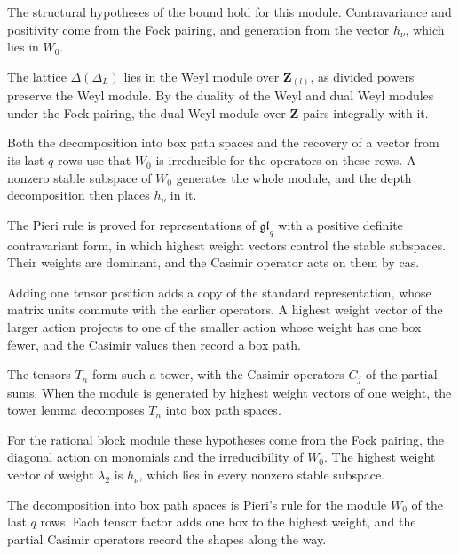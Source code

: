 The structural hypotheses of the bound hold for this module. Contravariance and positivity come from the
Fock pairing, and generation from the vector $h_\nu$, which lies in $W_0$.

The lattice $\Delta(\Delta_L)$ lies in the Weyl module over $\mathbf Z_{(l)}$, as divided powers preserve the
Weyl module. By the duality of the Weyl and dual Weyl modules under the Fock pairing, the dual Weyl module
over $\mathbf Z$ pairs integrally with it.

Both the decomposition into box path spaces and the recovery of a vector from its last $q$ rows use that $W_0$
is irreducible for the operators on these rows. A nonzero stable subspace of $W_0$ generates the whole module,
and the depth decomposition then places $h_\nu$ in it.

The Pieri rule is proved for representations of $\mathfrak{gl}_q$ with a positive definite contravariant form,
in which highest weight vectors control the stable subspaces. Their weights are dominant, and the Casimir
operator acts on them by $\mathrm{cas}$.

Adding one tensor position adds a copy of the standard representation, whose matrix units commute with the
earlier operators. A highest weight vector of the larger action projects to one of the smaller action whose weight
has one box fewer, and the Casimir values then record a box path.

The tensors $T_n$ form such a tower, with the Casimir operators $C_j$ of the partial sums. When the module is
generated by highest weight vectors of one weight, the tower lemma decomposes $T_n$ into box path spaces.

For the rational block module these hypotheses come from the Fock pairing, the diagonal action on monomials and
the irreducibility of $W_0$. The highest weight vector of weight $\lambda_2$ is $h_\nu$, which lies in every nonzero
stable subspace.

The decomposition into box path spaces is Pieri's rule for the module $W_0$ of the last $q$ rows. Each
tensor factor adds one box to the highest weight, and the partial Casimir operators record the shapes
along the way.

